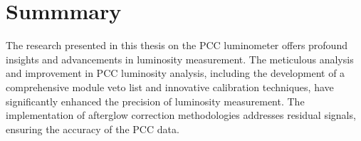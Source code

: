 \newpage

\section{Summmary}

The research presented in this thesis on the PCC luminometer offers profound insights and advancements in luminosity measurement. The meticulous analysis and improvement in PCC luminosity analysis, including the development of a comprehensive module veto list and innovative calibration techniques, have significantly enhanced the precision of luminosity measurement. The implementation of afterglow correction methodologies addresses residual signals, ensuring the accuracy of the PCC data.

